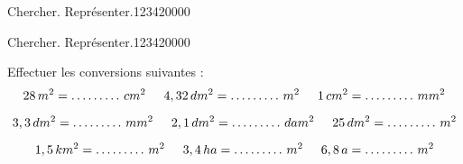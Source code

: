 \begin{pageAD}
\begin{ExoCad}{Chercher. Représenter.}{1234}{2}{0}{0}{0}{0}
\end{ExoCad}


 
 
\begin{ExoCad}{Chercher. Représenter.}{1234}{2}{0}{0}{0}{0}
 
Effectuer les conversions suivantes :
\[28\,m^2=\dots \ldots \ldots\,cm^2\hspace{.5cm}4,32\,dm^2=\dots \ldots \ldots\,m^2\hspace{.5cm}1\,cm^2=\dots \ldots \ldots\,mm^2\]

\[3,3\,dm^2=\dots \ldots \ldots\,mm^2\hspace{.5cm}2,1\,dm^2=\dots \ldots \ldots\,dam^2\hspace{.5cm}25\,dm^2=\dots \ldots \ldots\,m^2\]
 
\[1,5\,km^2=\dots \ldots \ldots\,m^2\hspace{.5cm}3,4\,ha =\dots \ldots \ldots\,m^2\hspace{.5cm}6,8\,a=\dots \ldots \ldots\,m^2\]
\end{ExoCad} 


\end{pageAD} 



